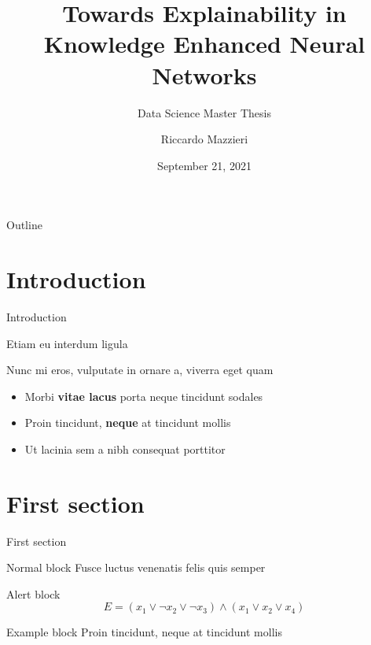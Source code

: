 \documentclass{beamer}
\title{Towards Explainability in Knowledge Enhanced Neural Networks}
\subtitle{Data Science Master Thesis}
\author{Riccardo Mazzieri}
\date{September 21, 2021}
\begin{document}
	\maketitle

	\begin{frame}{Outline}
		\tableofcontents
	\end{frame}


	\section{Introduction}

	\begin{frame}{Introduction}

		Etiam eu interdum ligula

		Nunc mi eros, vulputate in ornare a, viverra eget quam \vspace{.5em}

		\begin{itemize}
			\item Morbi \textbf{vitae lacus} porta neque tincidunt sodales \vspace{.5em}
			\item Proin tincidunt, \textbf{neque} at tincidunt mollis \vspace{.5em}
			\item Ut \alert{lacinia sem a nibh} consequat porttitor
		\end{itemize}
	\end{frame}


	\section{First section}

	\begin{frame}{First section}
		\begin{block}{Normal block}
			Fusce luctus venenatis felis quis semper
		\end{block}

		\begin{alertblock}{Alert block}
			$$ E = (x_1 \vee \neg x_2 \vee \neg x_3) \wedge (x_1 \vee x_2 \vee x_4) $$
		\end{alertblock}

		\begin{exampleblock}{Example block}
			Proin tincidunt, neque at tincidunt mollis
		\end{exampleblock}
	\end{frame}
\end{document}
